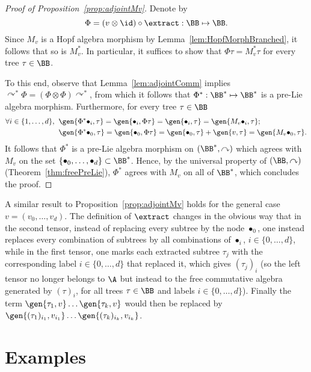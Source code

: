 \documentclass{article}
\begin{document}
\begin{proof}[Proof of Proposition~\ref{prop:adjointMv}]
Denote by
\[
\Phi = (v \otimes \id)\circ \extract : \BB \mapsto \BB.
\]
Since $M_v$ is a Hopf algebra morphism by Lemma~\ref{lem:HopfMorphBranched}, it follows that so is $M_v^*$. In particular, it suffices to show that $\Phi\tau = M_v^* \tau$ for every tree $\tau \in \BB$.

To this end, observe that Lemma~\ref{lem:adjointComm} implies $\curvearrowright^* \Phi = (\Phi \otimes \Phi)\curvearrowright^*$, from which it follows that $\Phi^* : \BB^* \mapsto \BB^*$ is a pre-Lie algebra morphism. Furthermore, for every tree $\tau \in \BB$
\begin{align*}
\forall i \in\{1,\ldots,d\}, \; \; &\gen{\Phi^* \bullet_i, \tau} = \gen{\bullet_i, \Phi \tau} = \gen{\bullet_i, \tau} = \gen{M_v\bullet_i, \tau}; \\
&\gen{\Phi^* \bullet_0, \tau} = \gen{\bullet_0, \Phi \tau} = \gen{\bullet_0, \tau} + \gen{v,\tau} = \gen{M_v\bullet_0, \tau}.
\end{align*}
It follows that $\Phi^*$ is a pre-Lie algebra morphism on $(\BB^*,\curvearrowright)$ which agrees with $M_v$ on the set $\{\bullet_0,\ldots,\bullet_d\} \subset \BB^*$. Hence, by the universal property of $(\BB,\curvearrowright)$ (Theorem~\ref{thm:freePreLie}), $\Phi^*$ agrees with $M_v$ on all of $\BB^*$, which concludes the proof.
\end{proof} 

\begin{remark}\label{remark:generalBranched}
A similar result to Proposition~\ref{prop:adjointMv} holds for the general case $v = (v_0,\ldots, v_d)$. The definition of $\extract$ changes in the obvious way that in the second tensor, instead of replacing every subtree by the node $\bullet_0$, one instead replaces every combination of subtrees by all combinations of $\bullet_i$, $i \in \{0,\ldots, d\}$, while in the first tensor, one marks each extracted subtree $\tau_j$ with the corresponding label $i \in \{0, \ldots, d\}$ that replaced it, which gives $(\tau_j)_i$ (so the left tensor no longer belongs to $\A$ but instead to the free commutative algebra generated by $(\tau)_i$, for all trees $\tau \in \BB$ and labels $i \in \{0,\ldots, d\}$). Finally the term $\gen{\tau_1,v}\ldots\gen{ \tau_k, v}$ would then be replaced by $\gen{(\tau_1)_{i_1}, v_{i_1}}\ldots \gen{(\tau_k)_{i_k}, v_{i_k}}$.
\end{remark}

\section{Examples} \label{sec:Ex}
\end{document}
